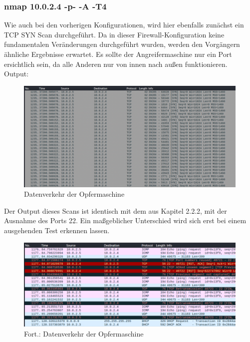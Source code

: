 \subsubsection{nmap 10.0.2.4 -p- -A -T4}
Wie auch bei den vorherigen Konfigurationen, wird hier ebenfalls zunächst ein TCP SYN Scan durchgeführt. Da in dieser Firewall-Konfiguration keine fundamentalen Veränderungen durchgeführt wurden, werden den Vorgängern ähnliche Ergebnisse erwartet. Es sollte der Angreifermaschine nur ein Port ersichtlich sein, da alle Anderen nur von innen nach außen funktionieren. \\
Output:
\begin{figure}
	\includegraphics[width=\linewidth]{img/ws_firewall_standard.png}
	\caption{Datenverkehr der Opfermaschine}
	\label{fig:ws_firewall_standard}
\end{figure}



Der Output dieses Scans ist identisch mit dem aus Kapitel 2.2.2, mit der Ausnahme des Ports 22. Ein maßgeblicher Unterschied wird sich erst bei einem ausgehenden Test erkennen lassen.

\begin{figure}
	\includegraphics[width=\linewidth]{img/ws_firewall_standard_2.png}
	\caption{Fort.: Datenverkehr der Opfermaschine}
	\label{fig:ws_firewall_standard_2}
\end{figure}

